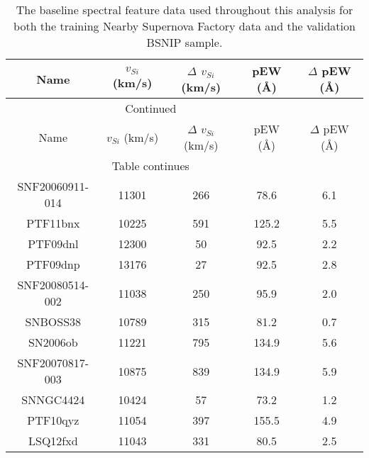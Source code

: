 \begin{longtable}{ccccc}
\caption{The baseline spectral feature data used throughout this analysis for both the training Nearby Supernova Factory data and the validation BSNIP sample.} \label{snf_data_table}\\
\toprule
Name & $v_{Si}$ (km/s) & $\Delta$ $v_{Si}$ (km/s) & pEW (\AA) & $\Delta$ pEW (\AA) \\
\midrule
\endfirsthead
\multicolumn{4}{c}{Continued}\\
\toprule
Name & $v_{Si}$ (km/s) & $\Delta$ $v_{Si}$ (km/s) & pEW (\AA) & $\Delta$ pEW (\AA) \\
\midrule
\endhead
\midrule
\multicolumn{4}{c}{Table continues}\\
\midrule
\endfoot
\bottomrule
\endlastfoot
SNF20060911-014 & 11301 & 266 & 78.6 & 6.1 \\
PTF11bnx & 10225 & 591 & 125.2 & 5.5 \\
PTF09dnl & 12300 & 50 & 92.5 & 2.2 \\
PTF09dnp & 13176 & 27 & 92.5 & 2.8 \\
SNF20080514-002 & 11038 & 250 & 95.9 & 2.0 \\
SNBOSS38 & 10789 & 315 & 81.2 & 0.7 \\
SN2006ob & 11221 & 795 & 134.9 & 5.6 \\
SNF20070817-003 & 10875 & 839 & 134.9 & 5.9 \\
SNNGC4424 & 10424 & 57 & 73.2 & 1.2 \\
PTF10qyz & 11054 & 397 & 155.5 & 4.9 \\
LSQ12fxd & 11043 & 331 & 80.5 & 2.5 \\

\end{longtable}
